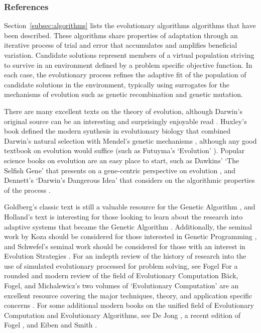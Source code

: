 \documentclass[a4paper, 11pt]{article}
\begin{document}
\subsubsection{References}
Section~\ref{subsec:algorithms} lists the evolutionary algorithms algorithms that have been described. These algorithms share properties of adaptation through an iterative process of trial and error that accumulates and amplifies beneficial variation. Candidate solutions represent members of a virtual population striving to survive in an environment defined by a problem specific objective function. In each case, the evolutionary process refines the adaptive fit of the population of candidate solutions in the environment, typically using surrogates for the mechanisms of evolution such as genetic recombination and genetic mutation.

There are many excellent texts on the theory of evolution, although Darwin's original source can be an interesting and surprisingly enjoyable read \cite{Darwin1859}. Huxley's book defined the modern synthesis in evolutionary biology that combined Darwin's natural selection with Mendel's genetic mechanisms \cite{Huxley1942}, although any good textbook on evolution would suffice (such as Futuyma's `Evolution' \cite{Futuyma2009}). Popular science books on evolution are an easy place to start, such as Dawkins' `The Selfish Gene' that presents on a gene-centric perspective on evolution \cite{Dawkins1976}, and Dennett's `Darwin's Dangerous Idea' that considers on the algorithmic properties of the process \cite{Dennett1995}.

Goldberg's classic text is still a valuable resource for the Genetic Algorithm \cite{Goldberg1989}, and Holland's text is interesting for those looking to learn about the research into adaptive systems that became the Genetic Algorithm \cite{Holland1975}. Additionally, the seminal work by Koza should be considered for those interested in Genetic Programming \cite{Koza1992}, and Schwefel's seminal work should be considered for those with an interest in Evolution Strategies \cite{Schwefel1981}. For an indepth review of the history of research into the use of simulated evolutionary processed for problem solving, see Fogel \cite{Fogel1998}
For a rounded and modern review of the field of Evolutionary Computation B\"ack, Fogel, and Michalewicz's two volumes of `Evolutionary Computation' are an excellent resource covering the major techniques, theory, and application specific concerns \cite{Baeck2000, Baeck2000a}.
For some additional modern books on the unified field of Evolutionary Computation and Evolutionary Algorithms, see De Jong \cite{Jong2006}, a recent edition of Fogel \cite{Fogel1995}, and Eiben and Smith \cite{Eiben2003}. 
\end{document}
